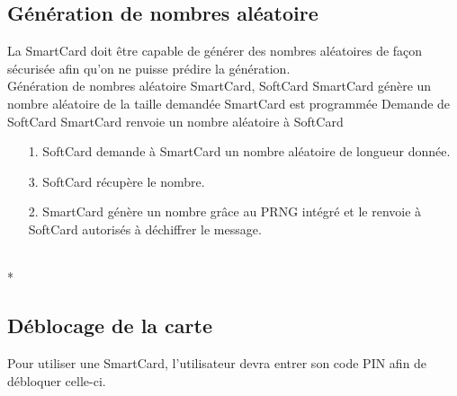 \documentclass[a4paper,11pt,french]{article}
\begin{document}
\subsection{Génération de nombres aléatoire}
La SmartCard doit être capable de générer des nombres aléatoires de façon 
sécurisée afin qu'on ne puisse prédire la génération.\\

\fiche
	{Génération de nombres aléatoire}
	{SmartCard, SoftCard}
    {SmartCard génère un nombre aléatoire de la taille demandée}
	{SmartCard est programmée}
    {Demande de SoftCard}
    {SmartCard renvoie un nombre aléatoire à SoftCard}
	{\begin{itemize}
	    \item[]
	  \item[1.] SoftCard demande à SmartCard un nombre aléatoire de longueur 
          donnée.
      \item[3.] SoftCard récupère le nombre.
	\end{itemize}
	}
	{\begin{itemize}
        \item[]
        \item[2.] SmartCard génère un nombre grâce au PRNG intégré et le renvoie à SoftCard
            autorisés à déchiffrer le message.
	\end{itemize}
    }
	{}
\flots
    {}
    {}
    {}
\\*

\subsection{Déblocage de la carte}
Pour utiliser une SmartCard, l'utilisateur devra entrer son code PIN afin de 
\og{}débloquer \fg{} celle-ci.\\
\end{document}
